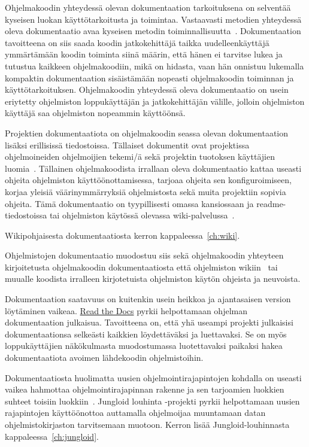 \documentclass[finnish]{tktltiki2}
\theoremstyle{definition}
\theoremstyle{remark}
\begin{document}
Ohjelmakoodin yhteydessä olevan dokumentaation tarkoituksena on selventää kyseisen luokan käyttötarkoitusta ja toimintaa. Vastaavasti metodien yhteydessä oleva dokumentaatio avaa kyseisen metodin toiminnallisuutta~\cite{javadoc}.
Dokumentaation tavoitteena on siis saada koodin jatkokehittäjä taikka uudelleenkäyttäjä ymmärtämään koodin toiminta siinä määrin, että hänen ei tarvitse lukea ja tutustua kaikkeen ohjelmakoodiin, mikä on hidasta, vaan hän onnistuu lukemalla kompaktin dokumentaation sisäistämään nopeasti ohjelmakoodin toiminnan ja käyttötarkoituksen. Ohjelmakoodin yhteydessä oleva dokumentaatio on usein eriytetty ohjelmiston loppukäyttäjän ja jatkokehittäjän välille, jolloin ohjelmiston käyttäjä saa ohjelmiston nopeammin käyttöönsä.

Projektien dokumentaatiota on ohjelmakoodin seassa olevan dokumentaation lisäksi erillisissä tiedostoissa. Tällaiset dokumentit ovat projektissa ohjelmoineiden ohjelmoijien tekemi/ä sekä projektin tuotoksen käyttäjien luomia~\cite{using-wikis-in-sw}.
Tällainen ohjelmakoodista irrallaan oleva dokumentaatio kattaa useasti ohjeita ohjelmiston käyttöönottamisessa, tarjoaa ohjeita sen konfiguroimiseen, korjaa yleisiä väärinymmärryksiä ohjelmistosta sekä muita projektiin sopivia ohjeita. Tämä dokumentaatio on tyypillisesti omassa kansiossaan ja readme-tiedostoissa tai ohjelmiston käytössä olevassa wiki-palvelussa~\cite{using-wikis-in-sw}.

Wikipohjaisesta dokumentaatiosta kerron kappaleessa~\ref{ch:wiki}.

Ohjelmistojen dokumentaatio muodostuu siis sekä ohjelmakoodin yhteyteen kirjoitetusta ohjelmakoodin dokumentaatiosta että ohjelmiston wikiin~\cite{using-wikis-in-sw} tai muualle koodista irralleen kirjotetuista ohjelmiston käytön ohjeista ja neuvoista.

Dokumentaation saatavuus on kuitenkin usein heikkoa ja ajantasaisen version löytäminen vaikeaa. \href{https://readthedocs.org/}{Read the Docs} pyrkii helpottamaan ohjelman dokumentaation julkaisua. Tavoitteena on, että yhä useampi projekti julkaisisi dokumentaationsa selkeästi kaikkien löydettäväksi ja luettavaksi. Se on myös loppukäyttäjien näkökulmasta muodostumassa luotettavaksi paikaksi hakea dokumentaatiota avoimen lähdekoodin ohjelmistoihin.

Dokumentaatiosta huolimatta uusien ohjelmointirajapintojen kohdalla on useasti vaikea hahmottaa ohjelmointirajapinnan rakenne ja sen tarjoamien luokkien suhteet toisiin luokkiin~\cite{jungloid-mining}. Jungloid louhinta -projekti pyrkii helpottamaan uusien rajapintojen käyttöönottoa auttamalla ohjelmoijaa muuntamaan datan ohjelmistokirjaston tarvitsemaan muotoon. Kerron lisää Jungloid-louhinnasta kappaleessa~\ref{ch:jungloid}.
\end{document}
